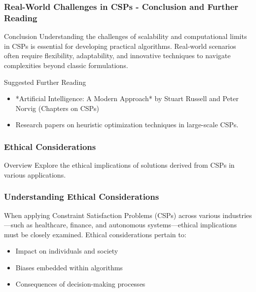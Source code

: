 \documentclass[aspectratio=169]{beamer}
\begin{document}
\begin{frame}[fragile]
    \frametitle{Real-World Challenges in CSPs - Conclusion and Further Reading}
    \begin{block}{Conclusion}
        Understanding the challenges of scalability and computational limits in CSPs is essential for developing practical algorithms. 
        Real-world scenarios often require flexibility, adaptability, and innovative techniques to navigate complexities beyond classic formulations.
    \end{block}
    
    \begin{block}{Suggested Further Reading}
        \begin{itemize}
            \item *Artificial Intelligence: A Modern Approach* by Stuart Russell and Peter Norvig (Chapters on CSPs)
            \item Research papers on heuristic optimization techniques in large-scale CSPs.
        \end{itemize}
    \end{block}
\end{frame}

\begin{frame}[fragile]
    \frametitle{Ethical Considerations}
    \begin{block}{Overview}
        Explore the ethical implications of solutions derived from CSPs in various applications.
    \end{block}
\end{frame}

\begin{frame}[fragile]
    \frametitle{Understanding Ethical Considerations}
    When applying Constraint Satisfaction Problems (CSPs) across various industries—such as healthcare, finance, and autonomous systems—ethical implications must be closely examined. 
    Ethical considerations pertain to:
    \begin{itemize}
        \item Impact on individuals and society
        \item Biases embedded within algorithms
        \item Consequences of decision-making processes
    \end{itemize}
\end{frame}
\end{document}

